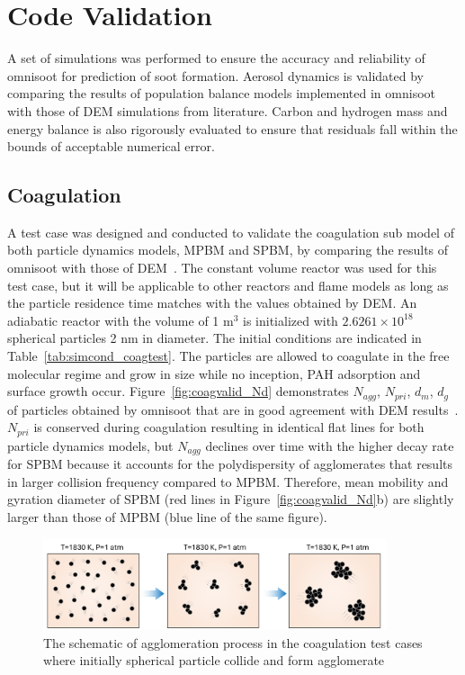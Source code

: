 \section{Code Validation}
A set of simulations was performed to ensure the accuracy and reliability of omnisoot for prediction of soot formation. Aerosol dynamics is validated by comparing the results of population balance models implemented in omnisoot with those of DEM simulations from literature. Carbon and hydrogen mass and energy balance is also rigorously evaluated to ensure that residuals fall within the bounds of acceptable numerical error.





\subsection{Coagulation}
A test case was designed and conducted to validate the coagulation sub model of both particle dynamics models, MPBM and SPBM, by comparing the results of omnisoot with those of DEM~\citep{kholghy2021surface}. The constant volume reactor was used for this test case, but it will be applicable to other reactors and flame models as long as the particle residence time matches with the values obtained by DEM. An adiabatic reactor with the volume of 1 $\mathrm{m^3}$ is initialized with $2.6261\times10^{18}$ spherical particles 2 nm in diameter. The initial conditions are indicated in Table~\ref{tab:simcond_coagtest}. The particles are allowed to coagulate in the free molecular regime and grow in size while no inception, PAH adsorption and surface growth occur. Figure~\ref{fig:coagvalid_Nd} demonstrates ${N_{agg}}$, ${N_{pri}}$, ${d_m}$, ${d_g}$ of particles obtained by omnisoot that are in good agreement with DEM results~\citep{kholghy2021surface}. ${N_{pri}}$ is conserved during coagulation resulting in identical flat lines for both particle dynamics models, but ${N_{agg}}$ declines over time with the higher decay rate for SPBM because it accounts for the polydispersity of agglomerates that results in larger collision frequency compared to MPBM. Therefore, mean mobility and gyration diameter  of SPBM (red lines in Figure~\ref{fig:coagvalid_Nd}b) are slightly larger than those of MPBM (blue line of the same figure).

\begin{figure}[H]
	\centering
	\includegraphics[width=0.9\textwidth]{Figures/Results/Validation/Coagulation/coagulation_scheme.pdf}
	\caption{The schematic of agglomeration process in the coagulation test cases where initially spherical particle collide and form agglomerate}
	\label{fig:coagscheme}
\end{figure}

